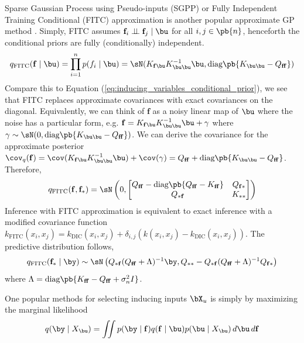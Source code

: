 \documentclass[11pt]{article}
\renewcommand\bf{\ensuremath{\mathbf{f}}}
\begin{document}
Sparse Gaussian Process using Pseudo-inputs (SGPP) or Fully Independent Training Conditional (FITC) approximation is another popular approximate GP method \cite{snelsonSparseGaussianProcesses2005}. Simply, FITC assumes $\bf_i\dperp \bf_j \mid \bu$ for all $i,j\in\pb{n}$, henceforth the conditional priors are fully (conditionally) independent. 
\begin{align}
    q_{\text{FITC}}(\bf\mid\bu)
        = \prod_{i=1}^n p(f_i\mid \bu)
        = \sN( K_{\bf\bu}K_{\bu\bu}^{-1} \bu, \text{diag}\pb{ K_{\bu\bu} - Q_{\bf\bf} } )
\end{align}
Compare this to Equation (\ref{eq:inducing_variables_conditional_prior}), we see that FITC replaces approximate covariances with exact covariances on the diagonal. Equivalently, we can think of $\bf$ as a noisy linear map of $\bu$ where the noise has a particular form, e.g. $\bf = K_{\bf\bu}K_{\bu\bu}^{-1} \bu + \gamma$ where $\gamma \sim \sN(0, \text{diag}\pb{ K_{\bu\bu} - Q_{\bf\bf} })$. We can derive the covariance for the approximate posterior $\cov_q(\bf) = \cov( K_{\bf\bu}K_{\bu\bu}^{-1} \bu ) + \cov( \gamma ) = Q_{\bf\bf} + \text{diag}\pb{  K_{\bu\bu} - Q_{\bf\bf} }$. Therefore,
\begin{align}
    q_{\text{FITC}}(\bf,\bf_*)
        = \sN\left(
            0,
            \begin{bmatrix}
                Q_{\bf\bf} - \text{diag}\pb{Q_{\bf\bf} - K_{\bf\bf}} & Q_{\bf*} \\ 
                Q_{*\bf} & K_{**} \\
            \end{bmatrix}
        \right)
\end{align}
Inference with FITC approximation is equivalent to exact inference with a modified covariance function $k_{\text{FITC}}(x_i,x_j) = k_{\text{DIC}}(x_i,x_j) + \delta_{i,j} (k(x_i,x_j) - k_{\text{DIC}}(x_i,x_j))$. The predictive distribution follows,
\begin{align}
    q_{\text{FITC}}(\bf_*\mid \by)
        \sim \sN\left(
            Q_{*\bf} ( Q_{\bf\bf} + \Lambda )^{-1} \by,
            Q_{**} - Q_{*\bf} ( Q_{\bf\bf} + \Lambda )^{-1} Q_{\bf*}
        \right)
\end{align}
where $\Lambda = \text{diag}\pb{ K_{\bf\bf} - Q_{\bf\bf} + \sigma_n^2 I }$.

One popular methods for selecting inducing inputs $\bX_u$ is simply by maximizing the marginal likelihood
\begin{align}
    q(\by\mid X_{\bu})
        = \iint p(\by\mid \bf) q(\bf\mid \bu) p(\bu\mid X_{\bu}) \, d\bu \, d\bf
\end{align}
\end{document}
